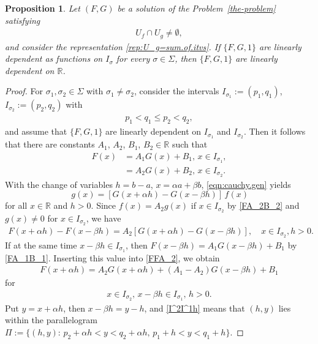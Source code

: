 \documentclass{birkjour}
\newtheorem{proposition}[theorem]{Proposition}
\begin{document}
\begin{proposition} 
\label{prop:X}
Let $(F,G)$ be a solution of the Problem~\ref{the-problem} satisfying 
\begin{align}
\label{Uf_disj_Ug}
U_f\cap U_g \neq \emptyset,
\end{align}
and consider the representation \eqref{rep:U_g=sum.of.itvs}. If $\{F, G, 1\}$ are linearly dependent as functions on $I_{\sigma}$ for every $\sigma\in\Sigma$, then $\{F, G, 1\}$ are linearly dependent on ${{\mathbb R}}$.
\end{proposition}
\begin{proof}
For $\sigma_1, \sigma_2 \in \Sigma$ with $\sigma_1 \neq \sigma_2$, consider the intervals $I_{\sigma_1} := (p_1,q_1)$, $I_{\sigma_2}:=(p_2,q_2)$ with 
\begin{align}\label{pqpq}
p_1<q_1\leq p_2<q_2,
\end{align}
and assume that $\{F, G, 1\}$ are linearly dependent on $I_{\sigma_1}$ and $I_{\sigma_2}$. Then it follows that there are constants $A_1$, $A_2$, $B_1$, $B_2 \in{{\mathbb R}}$ such that 
\begin{align}\label{FA_1B_1}
F(x) &= A_1G(x)+B_1, \, x\in I_{\sigma_1},\\ \label{FA_2B_2}
     &= A_2G(x)+B_2, \, x\in I_{\sigma_2}. 
\end{align}
With the change of variables $h=b-a$, $x=\alpha a+\beta b$, \eqref{eqn:cauchy.gen} yields
\begin{equation*}
[F(x+\alpha h)-F(x-\beta h)]\, g(x) = [G(x+\alpha h)-G(x-\beta h)]\, f(x)
\end{equation*}
for all $x\in{{\mathbb R}}$ and $h>0$. Since $f(x)=A_2g(x)$ if $x\in I_{\sigma_2}$ by \eqref{FA_2B_2} and $g(x)\neq 0$ for $x\in I_{\sigma_2}$, we have
\begin{align}\label{FFA_2}
F(x+\alpha h)-F(x-\beta h) = A_2[G(x+\alpha h)-G(x-\beta h)], 
\quad x\in I_{\sigma_2}, h>0.
\end{align}
If at the same time $x-\beta h\in I_{\sigma_1}$, then $F(x-\beta h)=A_1G(x-\beta h)+B_1$ by \eqref{FA_1B_1}. Inserting this value into \eqref{FFA_2}, we obtain
\begin{align}\label{FA_2B_1}
F(x+\alpha h) = A_2G(x+\alpha h)+(A_1-A_2)G(x-\beta h)+B_1
\end{align}
for
\begin{align}\label{I^2I^1h}
x\in I_{\sigma_2}, \, x-\beta h\in I_{\sigma_1}, \, h>0.
\end{align}
Put $y=x+\alpha h$, then $x-\beta h=y-h$, and \eqref{I^2I^1h} means that $(h,y)$ lies within the parallelogram $
\Pi := \bigl\{(h,y): \, p_2+\alpha h<y<q_2+\alpha h, \, p_1+h<y<q_1+h\bigr\}$.


\end{proof}
\end{document}
